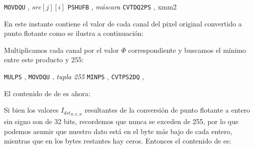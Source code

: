 \begin{pseudocodigo}
    \STATE \texttt{MOVDQU} ,   $src[j][i]$      
    \STATE \texttt{PSHUFB} ,   \textit{máscara} 
    \STATE \texttt{CVTDQ2PS} , xmm{2}           
\end{pseudocodigo}

En este instante  contiene el valor de cada canal del pixel original
convertido a punto flotante como se ilustra a continuación:

\begin{center}
\end{center}

Multiplicamos cada canal por el valor $\Phi$ correspondiente y buscamos
el mínimo entre este producto y 255:

\begin{pseudocodigo}
    \STATE \texttt{MULPS}    ,  
    \STATE \texttt{MOVDQU}   , \textit{tupla 255}
    \STATE \texttt{MINPS}    , 
    \STATE \texttt{CVTPS2DQ} ,  
\end{pseudocodigo}

El contenido de de  es ahora:

\begin{center}
\end{center}

Si bien los valores $I_{dst_{R,G,B}}$ resultantes de la conversión de punto flotante a
entero sin signo son de 32 bits, recordemos que nunca se exceden de 255, por lo que podemos
asumir que nuestro dato está en el byte más bajo de cada entero, mientras que en los bytes
restantes hay ceros. Entonces el contenido de  es:

\begin{center}
\end{center}

